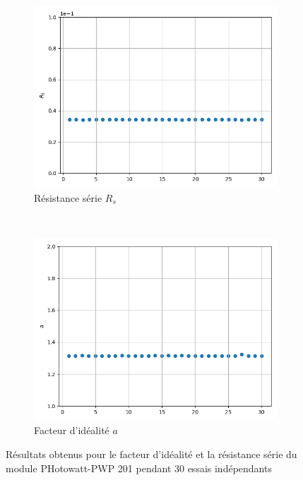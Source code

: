 \begin{figure}
    \centering
    \begin{subfigure}[b]{0.45\textwidth}
        \includegraphics[width=\textwidth]{resources/pwp/rsconsist.png}
        \caption{Résistance série $R_s$}
    \end{subfigure}
    ~
    \begin{subfigure}[b]{0.45\textwidth}
        \includegraphics[width=\textwidth]{resources/pwp/aconsist.png}
        \caption{Facteur d'idéalité $a$}
    \end{subfigure}
    \caption{Résultats obtenus pour le facteur d'idéalité et la résistance série du module PHotowatt-PWP 201 pendant 30 essais indépendants}
    \label{fig:paramconsist}
\end{figure}

